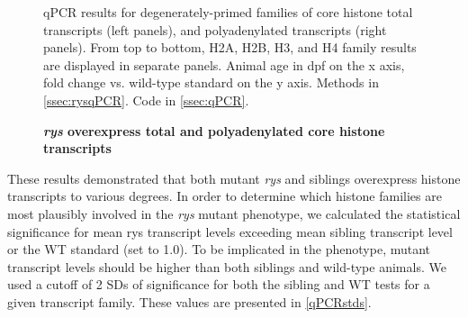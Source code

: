 \documentclass{ut-thesis}
\begin{document}
\begin{NoHyper}
\begin{figure}[!h]
    \caption{{\bf \textit{rys} overexpress total and polyadenylated core histone transcripts}}
    qPCR results for degenerately-primed families of core histone total transcripts (left panels), and polyadenylated transcripts (right panels). From top to bottom, H2A, H2B, H3, and H4 family results are displayed in separate panels. Animal age in dpf on the x axis, fold change vs. wild-type standard on the y axis.    
    \label{histonertpcr}
    Methods in \autoref{ssec:rysqPCR}.
    Code in \autoref{ssec:qPCR}.
\end{figure}

These results demonstrated that both mutant \textit{rys} and siblings overexpress histone transcripts to various degrees. In order to determine which histone families are most plausibly involved in the \textit{rys} mutant phenotype, we calculated the statistical significance for mean rys transcript levels exceeding mean sibling transcript level or the WT standard (set to 1.0). To be implicated in the phenotype, mutant transcript levels should be higher than both siblings and wild-type animals. We used a cutoff of 2 SDs of significance for both the sibling and WT tests for a given transcript family. These values are presented in \autoref{qPCRstds}.


\end{NoHyper}
\end{document}
